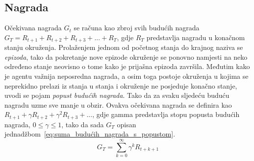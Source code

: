 \subsection{Nagrada}
Očekivana nagrada $G_t$ se računa kao zbroj svih budućih nagrada $G_T = R_{t+1}+R_{t+2}+R_{t+3}+ ... + R_T$, gdje $R_T$ predstavlja nagradu u konačnom stanju okruženja. Prolaženjem jednom od početnog stanja do krajnog naziva se \emph{epizoda}, tako da pokretanje nove epizode okruženje se ponovno namjesti na neko određeno stanje neovisno o tome kako je prijašna epizoda završila. Međutim kako je agentu važnija neposredna nagrada, a osim toga postoje okruženja u kojima se neprekidno prelazi iz stanja u stanja i okruženje ne posjeduje konačno stanje, uvodi se pojam \emph{popust budućih nagrada}. Tako da za svaku sljedeću buduću nagradu uzme sve manje u obzir. Ovakva očekivana nagrada se definira kao $R_{t+1} + \gamma R_{t+2} + \gamma ^2 R_{t+3}+...$, gdje gamma predstavlja stopu popusta budućih nagrada, $0 \leq \gamma \leq 1$, tako da sada $G_T$ opisan jednadžbom~\ref{eq:suma_budućih_nagrada_s_popustom}.
\begin{equation}\label{eq:suma_budućih_nagrada_s_popustom}
	G_T = \sum_{k=0}^{\infty} \gamma^k R_{t+k+1}
\end{equation}

